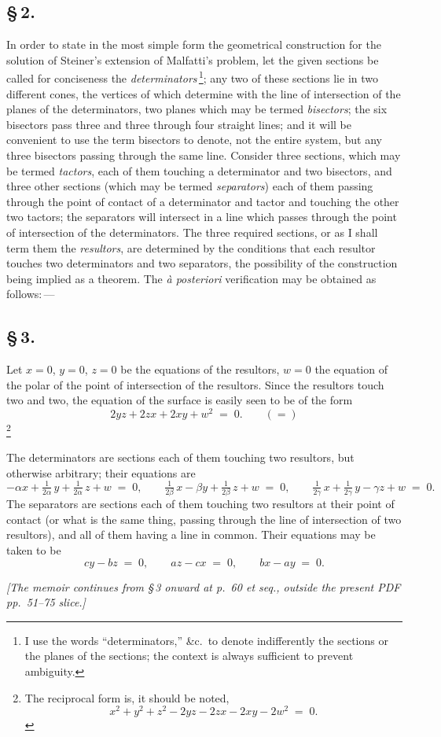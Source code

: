 \documentclass[11pt]{article}
\begin{document}
\subsection*{\S\,2.}

In order to state in the most simple form the geometrical construction for the solution of Steiner's extension of Malfatti's problem, let the given sections be called for conciseness the \emph{determinators}\,\footnote{I use the words ``determinators,'' \&c.\ to denote indifferently the sections or the planes of the sections; the context is always sufficient to prevent ambiguity.}; any two of these sections lie in two different cones, the vertices of which determine with the line of intersection of the planes of the determinators, two planes which may be termed \emph{bisectors}; the six bisectors pass three and three through four straight lines; and it will be convenient to use the term bisectors to denote, not the entire system, but any three bisectors passing through the same line. Consider three sections, which may be termed \emph{tactors}, each of them touching a determinator and two bisectors, and three other sections (which may be termed \emph{separators}) each of them passing through the point of contact of a determinator and tactor and touching the other two tactors; the separators will intersect in a line which passes through the point of intersection of the determinators. The three required sections, or as I shall term them the \emph{resultors}, are determined by the conditions that each resultor touches two determinators and two separators, the possibility of the construction being implied as a theorem. The \emph{\`a posteriori} verification may be obtained as follows:\,---

\subsection*{\S\,3.}

Let $x = 0$, $y = 0$, $z = 0$ be the equations of the resultors, $w = 0$ the equation of the polar of the point of intersection of the resultors. Since the resultors touch two and two, the equation of the surface is easily seen to be of the form
\[
2 y z + 2 z x + 2 x y + w^{2} \;=\; 0.\qquad (=)
\]
\footnote{The reciprocal form is, it should be noted,
\[
x^{2} + y^{2} + z^{2} - 2 y z - 2 z x - 2 x y - 2 w^{2} \;=\; 0.
\]}

The determinators are sections each of them touching two resultors, but otherwise arbitrary; their equations are
\[
-\alpha x + \tfrac{1}{2\alpha}\,y + \tfrac{1}{2\alpha}\,z + w \;=\; 0,\qquad
\tfrac{1}{2\beta}\,x - \beta y + \tfrac{1}{2\beta}\,z + w \;=\; 0,\qquad
\tfrac{1}{2\gamma}\,x + \tfrac{1}{2\gamma}\,y - \gamma z + w \;=\; 0.
\]
The separators are sections each of them touching two resultors at their point of contact (or what is the same thing, passing through the line of intersection of two resultors), and all of them having a line in common. Their equations may be taken to be
\[
c y - b z \;=\; 0,\qquad a z - c x \;=\; 0,\qquad b x - a y \;=\; 0.
\]

\bigskip

\noindent\emph{[The memoir continues from \S\,3 onward at p.~60 et seq., outside the present PDF pp.~51--75 slice.]}
\end{document}
